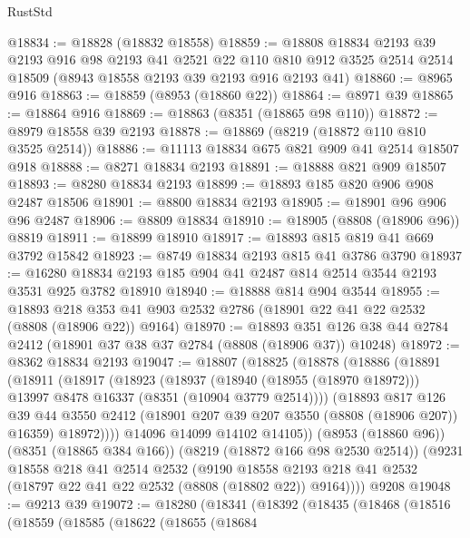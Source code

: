 \begin{lexlean}{RustStd}
\begin{coremodule}
@18834 := @18828 (@18832 @18558)
@18859 := @18808
    @18834
    @2193
    @39
    @2193
    @916
    @98
    @2193
    @41
    @2521
    @22
    @110
    @810
    @912
    @3525
    @2514
    @2514
    @18509
    (@8943 @18558 @2193 @39 @2193 @916 @2193 @41)
@18860 := @8965 @916
@18863 := @18859 (@8953 (@18860 @22))
@18864 := @8971 @39
@18865 := @18864 @916
@18869 := @18863 (@8351 (@18865 @98 @110))
@18872 := @8979 @18558 @39 @2193
@18878 := @18869 (@8219 (@18872 @110 @810 @3525 @2514))
@18886 := @11113 @18834 @675 @821 @909 @41 @2514 @18507 @918
@18888 := @8271 @18834 @2193
@18891 := @18888 @821 @909 @18507
@18893 := @8280 @18834 @2193
@18899 := @18893 @185 @820 @906 @908 @2487 @18506
@18901 := @8800 @18834 @2193
@18905 := @18901 @96 @906 @96 @2487
@18906 := @8809 @18834
@18910 := @18905 (@8808 (@18906 @96)) @8819
@18911 := @18899 @18910
@18917 := @18893 @815 @819 @41 @669 @3792 @15842
@18923 := @8749 @18834 @2193 @815 @41 @3786 @3790
@18937 := @16280 @18834 @2193 @185 @904 @41 @2487 @814 @2514 @3544 @2193 @3531 @925 @3782 @18910
@18940 := @18888 @814 @904 @3544
@18955 := @18893
    @218
    @353
    @41
    @903
    @2532
    @2786
    (@18901 @22 @41 @22 @2532 (@8808 (@18906 @22)) @9164)
@18970 := @18893
    @351
    @126
    @38
    @44
    @2784
    @2412
    (@18901 @37 @38 @37 @2784 (@8808 (@18906 @37)) @10248)
@18972 := @8362 @18834 @2193
@19047 := @18807
    (@18825
      (@18878
        (@18886
          (@18891
            (@18911
              (@18917
                (@18923
                  (@18937
                    (@18940 (@18955 (@18970 @18972)))
                    @13997
                    @8478
                    @16337
                    (@8351 (@10904 @3779 @2514))))
                (@18893
                  @817
                  @126
                  @39
                  @44
                  @3550
                  @2412
                  (@18901 @207 @39 @207 @3550 (@8808 (@18906 @207)) @16359)
                  @18972))))
          @14096
          @14099
          @14102
          @14105))
      (@8953 (@18860 @96))
      (@8351 (@18865 @384 @166))
      (@8219 (@18872 @166 @98 @2530 @2514))
      (@9231
        @18558
        @218
        @41
        @2514
        @2532
        (@9190 @18558 @2193 @218 @41 @2532 (@18797 @22 @41 @22 @2532 (@8808 (@18802 @22)) @9164))))
    @9208
@19048 := @9213 @39
@19072 := @18280
    (@18341
      (@18392
        (@18435
          (@18468
            (@18516
              (@18559
                (@18585
                  (@18622
                    (@18655
                      (@18684

\end{coremodule}
\end{lexlean}
